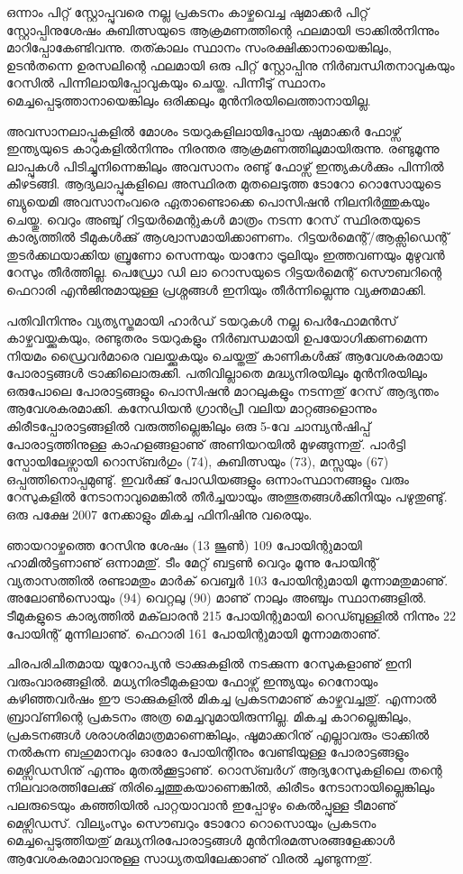ഒന്നാം പിറ്റ് സ്റ്റോപ്പുവരെ നല്ല പ്രകടനം കാഴ്ചവെച്ച ഷുമാക്കര്‍ പിറ്റ് സ്റ്റോപ്പിനുശേഷം കുബിത്സയുടെ ആക്രമണത്തിന്റെ 
ഫലമായി ട്രാക്കില്‍നിന്നും മാറിപ്പോകേണ്ടിവന്നു. തത്കാലം സ്ഥാനം സംരക്ഷിക്കാനായെങ്കിലും, ഉടന്‍തന്നെ 
ഉരസലിന്റെ ഫലമായി ഒരു പിറ്റ് സ്റ്റോപ്പിനു നിര്‍ബന്ധിതനാവുകയും റേസില്‍ പിന്നിലായിപ്പോവുകയും ചെയ്ത. പിന്നീടു് 
സ്ഥാനം മെച്ചപ്പെടുത്താനായെങ്കിലും ഒരിക്കലും മുന്‍നിരയിലെത്താനായില്ല.

അവസാനലാപ്പുകളില്‍ മോശം ടയറുകളിലായിപ്പോയ ഷുമാക്കര്‍ ഫോഴ്സ് ഇന്ത്യയുടെ കാറുകളില്‍നിന്നും നിരന്തര 
ആക്രമണത്തിലുമായിരുന്നു. രണ്ടുമൂന്നു ലാപ്പുകള്‍ പിടിച്ചുനിന്നെങ്കിലും അവസാനം രണ്ടു് ഫോഴ്സ് ഇന്ത്യകള്‍ക്കും പിന്നില്‍ 
കീഴടങ്ങി. ആദ്യലാപ്പുകളിലെ അസ്ഥിരത മുതലെടുത്ത ടോറോ റൊസോയുടെ ബ്യുയെമി അവസാനംവരെ 
ഏതാണ്ടൊക്കെ പൊസിഷന്‍ നിലനിര്‍ത്തുകയും ചെയ്തു. വെറും അഞ്ചു് റിട്ടയര്‍മെന്റുകള്‍ മാത്രം നടന്ന റേസ് 
സ്ഥിരതയുടെ കാര്യത്തില്‍ ടീമുകള്‍ക്കു് ആശ്വാസമായിക്കാണണം. റിട്ടയര്‍മെന്റ്/ആക്സിഡെന്റ് തുടര്‍ക്കഥയാക്കിയ 
ബ്രൂണോ സെന്നയും യാനോ ട്രൂലിയും ഇത്തവണയും മുഴുവന്‍ റേസും തീര്‍ത്തില്ല. പെഡ്രോ ഡി ലാ റൊസയുടെ 
റിട്ടയര്‍മെന്റ് സൌബറിന്റെ ഫെറാരി എന്‍ജിനുമായുള്ള പ്രശ്നങ്ങള്‍ ഇനിയും തീര്‍ന്നില്ലെന്നു വ്യക്തമാക്കി.

പതിവിനിന്നും വ്യത്യസ്തമായി ഹാര്‍ഡ് ടയറുകള്‍ നല്ല പെര്‍ഫോമന്‍സ് കാഴ്ചവയ്ക്കുകയും, രണ്ടുതരം ടയറുകളും 
നിര്‍ബന്ധമായി ഉപയോഗിക്കണമെന്ന നിയമം ഡ്രൈവര്‍മാരെ വലയ്ക്കുകയും ചെയ്തതു് കാണികള്‍ക്കു് ആവേശകരമായ 
പോരാട്ടങ്ങള്‍ ട്രാക്കിലൊരുക്കി. പതിവില്ലാതെ മദ്ധ്യനിരയിലും മുന്‍നിരയിലും ഒരുപോലെ പോരാട്ടങ്ങളും പൊസിഷന്‍ 
മാറലുകളും നടന്നതു് റേസ് ആദ്യന്തം ആവേശകരമാക്കി. കനേഡിയന്‍ ഗ്രാന്‍പ്രീ വലിയ മാറ്റങ്ങളൊന്നും 
കിരീടപ്പോരാട്ടങ്ങളില്‍ വരുത്തില്ലെങ്കിലും ഒരു 5-വേ ചാമ്പ്യന്‍ഷിപ്പ് പോരാട്ടത്തിനുള്ള കാഹളങ്ങളാണു് അണിയറയില്‍ മുഴങ്ങുന്നതു്. 
പാര്‍ട്ടി സ്പോയിലേഴ്സായി റൊസ്ബര്‍ഗും (74), കുബിത്സയും (73), മസ്സയും (67) ഒപ്പത്തിനൊപ്പമുണ്ടു്. 
ഇവര്‍ക്കു് പോഡിയങ്ങളും ഒന്നാംസ്ഥാനങ്ങളും വരും റേസുകളില്‍ നേടാനാവുമെങ്കില്‍ തീര്‍ച്ചയായും അത്ഭുതങ്ങള്‍ക്കിനിയും
പഴുതുണ്ടു്. ഒരു പക്ഷേ 2007 നേക്കാളും മികച്ച ഫിനിഷിനു വരെയും.

ഞായറാഴ്ചത്തെ റേസിനു ശേഷം (13 ജൂണ്‍) 109 പോയിന്റുമായി ഹാമില്‍ട്ടണാണു് ഒന്നാമതു്. ടീം മേറ്റ് ബട്ടണ്‍ വെറും 
മൂന്നു പോയിന്റ് വ്യതാസത്തില്‍ രണ്ടാമതും മാര്‍ക് വെബ്ബര്‍ 103 പോയിന്റുമായി മൂന്നാമതുമാണു്. അലോണ്‍സൊയും (94) വെറ്റലു (90) മാണു് 
നാലും അഞ്ചും സ്ഥാനങ്ങളില്‍. ടീമുകളുടെ കാര്യത്തില്‍ മക്‌ലാരന്‍ 215 പോയിന്റുമായി 
റെഡ്ബുള്ളില്‍ നിന്നും 22 പോയിന്റ് മുന്നിലാണു്. ഫെറാരി 161 പോയിന്റുമായി മൂന്നാമതാണു്.

ചിരപരിചിതമായ യൂറോപ്യന്‍ ട്രാക്കുകളില്‍ നടക്കുന്ന റേസുകളാണു് ഇനി വരുംവാരങ്ങളില്‍. മധ്യനിരടീമുകളായ ഫോഴ്സ്
ഇന്ത്യയും റെനോയും കഴിഞ്ഞവര്‍ഷം ഈ ട്രാക്കുകളില്‍ മികച്ച പ്രകടനമാണു് കാഴ്ചവച്ചതു്. എന്നാല്‍ ബ്രാവ്‌ണിന്റെ 
പ്രകടനം അത്ര മെച്ചവുമായിരുന്നില്ല. മികച്ച കാറല്ലെങ്കിലും, പ്രകടനങ്ങള്‍ ശരാശരിമാത്രമാണെങ്കിലും, ഷൂമാക്കറിനു് 
എല്ലാവരും ട്രാക്കില്‍ നല്‍കുന്ന ബഹുമാനവും ഓരോ പോയിന്റിനും വേണ്ടിയുള്ള പോരാട്ടങ്ങളും മെഴ്സിഡസിനു് എന്നും 
മുതല്‍ക്കൂട്ടാണു്. റൊസ്ബര്‍ഗ് ആദ്യറേസുകളിലെ തന്റെ നിലവാരത്തിലേക്കു് തിരിച്ചെത്തുകയാണെങ്കില്‍, കിരീടം 
നേടാനായില്ലെങ്കിലും പലരുടെയും കഞ്ഞിയില്‍ പാറ്റയാവാന്‍ ഇപ്പോഴും കെല്‍പ്പുള്ള ടീമാണു് മെഴ്സിഡസ്. വില്യംസും 
സൌബറും ടോറോ റൊസൊയും പ്രകടനം മെച്ചപ്പെടുത്തിയതു് മദ്ധ്യനിരപോരാട്ടങ്ങള്‍ മുന്‍നിരമത്സരങ്ങളേക്കാള്‍ 
ആവേശകരമാവാനുള്ള സാധ്യതയിലേക്കാണു് വിരല്‍ ചൂണ്ടുന്നതു്.

